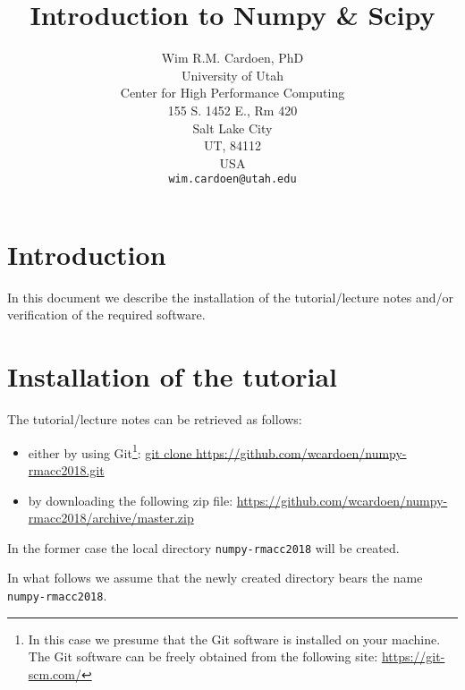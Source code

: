 \documentclass[11pt]{article}
\begin{document}
\title{Introduction to Numpy \& Scipy}
\author{Wim R.M. Cardoen, PhD\\
        University of Utah\\
        Center for High Performance Computing\\
        155 S. 1452 E., Rm 420\\
        Salt Lake City\\
        UT, 84112\\
        USA\\
        \texttt{wim.cardoen@utah.edu}}
\renewcommand{\today}{Aug. 7, 2018}
\renewcommand{\labelitemii}{$\star$}
\maketitle

\section*{Introduction}
In this document we describe the installation of the tutorial/lecture notes 
and/or verification of the required software.

\renewcommand \thesection{\Roman{section}}
\section{Installation of the tutorial}
The tutorial/lecture notes can be retrieved as follows:
\begin{itemize}
\item either by using Git\footnote{In this case we presume that the Git software is installed on your machine. The Git software can be freely obtained from the following site: \href{https://git-scm.com/}{https://git-scm.com/}}:\newline
      \href{git clone https://github.com/wcardoen/numpy-rmacc2018.git}{git clone https://github.com/wcardoen/numpy-rmacc2018.git}
\item by downloading the following zip file:\newline
   \href{https://github.com/wcardoen/numpy-rmacc2018/archive/master.zip}{https://github.com/wcardoen/numpy-rmacc2018/archive/master.zip}
\end{itemize}
In the former case the local directory \texttt{numpy-rmacc2018} 
will be created. 

In what follows we assume that the newly created directory bears the name \texttt{numpy-rmacc2018}.  
\end{document}
